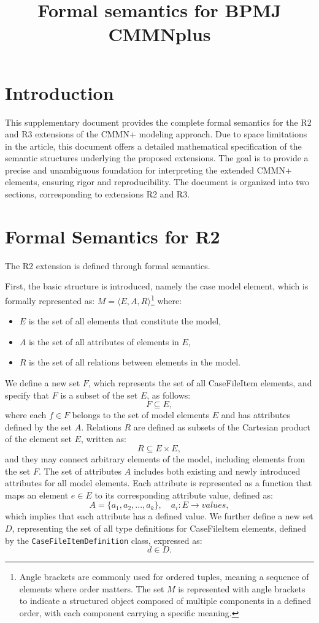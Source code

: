 \documentclass{article}
\title{Formal semantics for BPMJ CMMNplus}
\begin{document}
\maketitle

\section{Introduction}
This supplementary document provides the complete formal semantics for the R2 and R3 extensions of the CMMN+ modeling approach. Due to space limitations in the article, this document offers a detailed mathematical specification of the semantic structures underlying the proposed extensions. The goal is to provide a precise and unambiguous foundation for interpreting the extended CMMN+ elements, ensuring rigor and reproducibility. The document is organized into two sections, corresponding to extensions R2 and R3.

\section{Formal Semantics for R2}
The R2 extension is defined through formal semantics.

First, the basic structure is introduced, namely the case model element, which is formally represented as:
\( M = \langle E, A, R \rangle \)\footnote{Angle brackets are commonly used for ordered tuples, meaning a sequence of elements where order matters. The set \( M \) is represented with angle brackets to indicate a structured object composed of multiple components in a defined order, with each component carrying a specific meaning.} where:
\begin{itemize}
    \item \( E \) is the set of all elements that constitute the model,
    \item \( A \) is the set of all attributes of elements in \( E \),
    \item \( R \) is the set of all relations between elements in the model.
\end{itemize}

We define a new set \( F \), which represents the set of all CaseFileItem elements, and specify that \( F \) is a subset of the set \( E \), as follows:
\[
F \subseteq E,
\]
where each \( f \in F \) belongs to the set of model elements \( E \) and has attributes defined by the set \( A \). Relations \( R \) are defined as subsets of the Cartesian product of the element set \( E \), written as:
\[
R \subseteq E \times E,
\]
and they may connect arbitrary elements of the model, including elements from the set \( F \). The set of attributes \( A \) includes both existing and newly introduced attributes for all model elements. Each attribute is represented as a function that maps an element \( e \in E \) to its corresponding attribute value, defined as:
\[
A = \{a_1, a_2, ..., a_k\},\quad a_i: E \rightarrow values,
\]
which implies that each attribute has a defined value. We further define a new set \( D \), representing the set of all type definitions for CaseFileItem elements, defined by the \texttt{CaseFileItemDefinition} class, expressed as:
\[
d \in D.
\]
\end{document}
